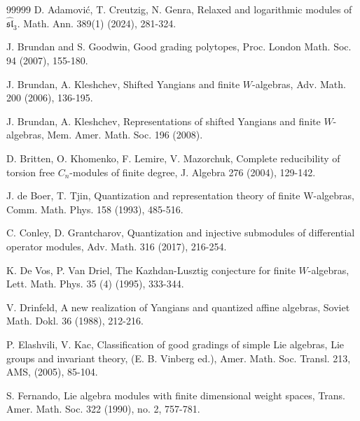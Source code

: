 \documentclass[12pt,a4paper]{amsart}
\numberwithin{equation}{section}
\def\sl{\mathfrak{sl}}
\begin{document}
\begin{thebibliography}{99999}
 D. Adamovi\'c, T. Creutzig, N. Genra, Relaxed and logarithmic modules of $\widehat{\sl}_3$. Math. Ann. 389(1)  (2024), 281-324.

   J. Brundan and S. Goodwin, Good grading polytopes, Proc. London Math. Soc. 94
(2007), 155-180.


   J. Brundan, A. Kleshchev, Shifted Yangians and finite $W$-algebras, Adv. Math. 200
(2006), 136-195.

  J. Brundan, A. Kleshchev, Representations of shifted Yangians and finite $W$-algebras, Mem.
Amer. Math. Soc. 196  (2008).

 D. Britten, O. Khomenko, F. Lemire, V. Mazorchuk, Complete reducibility of torsion free $C_n$-modules of finite degree, J. Algebra 276  (2004), 129-142.

  J. de Boer, T. Tjin, Quantization and representation theory of finite W-algebras, Comm. Math. Phys. 158  (1993), 485-516.



 C. Conley, D. Grantcharov,  Quantization and injective submodules of differential operator modules, Adv. Math. 316  (2017), 216-254.




 K. De Vos, P. Van Driel, The Kazhdan-Lusztig conjecture for finite $W$-algebras, Lett. Math. Phys. 35 (4)  (1995), 333-344.

 V. Drinfeld, A new realization of Yangians and quantized affine algebras, Soviet Math.
Dokl. 36  (1988), 212-216.

  P. Elashvili, V. Kac, Classification of good gradings of simple Lie algebras, Lie groups and invariant theory, (E. B. Vinberg ed.), Amer. Math. Soc. Transl. 213, AMS, (2005), 85-104.

       S. Fernando, Lie algebra modules with finite dimensional weight spaces, Trans. Amer. Math. Soc. 322  (1990), no. 2, 757-781.


\end{thebibliography}
\end{document}

